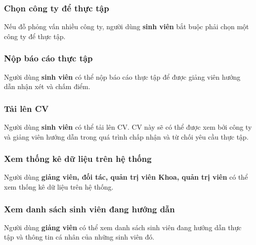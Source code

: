 \documentclass[./../main.tex]{subfiles}
\begin{document}
\hypertarget{chux1ecdn-cuxf4ng-ty-ux111ux1ec3-thux1ef1c-tux1eadp}{%
	\subsubsection{Chọn công ty để thực
		tập}\label{chux1ecdn-cuxf4ng-ty-ux111ux1ec3-thux1ef1c-tux1eadp}}
  
Nếu đỗ phỏng vấn nhiều công ty, người dùng \textbf{sinh viên} bắt buộc
phải chọn một công ty để thực tập.
  
\hypertarget{nux1ed9p-buxe1o-cuxe1o-thux1ef1c-tux1eadp}{%
	\subsubsection{Nộp báo cáo thực
		tập}\label{nux1ed9p-buxe1o-cuxe1o-thux1ef1c-tux1eadp}}
  
Người dùng \textbf{sinh viên} có thể nộp báo cáo thực tập để được giảng
viên hướng dẫn nhận xét và chấm điểm.
  
\hypertarget{tux1ea3i-luxean-cv}{%
	\subsubsection{Tải lên CV}\label{tux1ea3i-luxean-cv}}
  
Người dùng \textbf{sinh viên} có thể tải lên CV. CV này sẽ có thể được
xem bởi công ty và giảng viên hướng dẫn trong quá trình chấp nhận và từ
chối yêu cầu thực tập.
  
\hypertarget{xem-thux1ed1ng-kuxea-dux1eef-liux1ec7u-truxean-hux1ec7-thux1ed1ng}{%
	\subsubsection{Xem thống kê dữ liệu trên hệ
		thống}\label{xem-thux1ed1ng-kuxea-dux1eef-liux1ec7u-truxean-hux1ec7-thux1ed1ng}}
  
Người dùng \textbf{giảng viên, đối tác, quản trị viên Khoa, quản trị
viên} có thể xem thống kê dữ liệu trên hệ thống.
  
\hypertarget{xem-danh-suxe1ch-sinh-viuxean-ux111ang-hux1b0ux1edbng-dux1eabn}{%
	\subsubsection{Xem danh sách sinh viên đang hướng
		dẫn}\label{xem-danh-suxe1ch-sinh-viuxean-ux111ang-hux1b0ux1edbng-dux1eabn}}
  
Người dùng \textbf{giảng viên} có thể xem danh sách sinh viên đang hướng
dẫn thực tập và thông tin cá nhân của những sinh viên đó.
  
\end{document}
